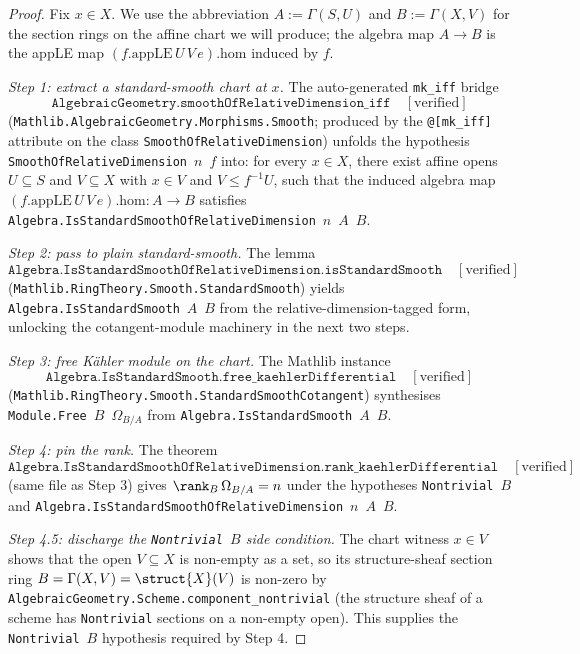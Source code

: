 \begin{proof}
  
  \leanok
  Fix \(x \in X\). We use the abbreviation \(A := \Gamma(S, U)\) and \(B := \Gamma(X, V)\) for the section rings on the affine chart we will produce; the algebra map \(A \to B\) is the appLE map \((f.\mathrm{appLE}\,U\,V\,e).\mathrm{hom}\) induced by \(f\).

  \emph{Step 1: extract a standard-smooth chart at \(x\).} The auto-generated \texttt{mk\_iff} bridge
  \[
    \texttt{AlgebraicGeometry.smoothOfRelativeDimension\_iff} \quad [\text{verified}]
  \]
  (\texttt{Mathlib.AlgebraicGeometry.Morphisms.Smooth}; produced by the \texttt{@[mk\_iff]} attribute on the class \texttt{SmoothOfRelativeDimension}) unfolds the hypothesis \texttt{SmoothOfRelativeDimension}~\(n\)~\(f\) into: for every \(x \in X\), there exist affine opens \(U \subseteq S\) and \(V \subseteq X\) with \(x \in V\) and \(V \leq f^{-1}U\), such that the induced algebra map \((f.\mathrm{appLE}\,U\,V\,e).\mathrm{hom}\colon A \to B\) satisfies \texttt{Algebra.IsStandardSmoothOfRelativeDimension}~\(n\)~\(A\)~\(B\).

  \emph{Step 2: pass to plain standard-smooth.} The lemma
  \[
    \texttt{Algebra.IsStandardSmoothOfRelativeDimension.isStandardSmooth} \quad [\text{verified}]
  \]
  (\texttt{Mathlib.RingTheory.Smooth.StandardSmooth}) yields \texttt{Algebra.IsStandardSmooth}~\(A\)~\(B\) from the relative-dimension-tagged form, unlocking the cotangent-module machinery in the next two steps.

  \emph{Step 3: free K\"ahler module on the chart.} The Mathlib instance
  \[
    \texttt{Algebra.IsStandardSmooth.free\_kaehlerDifferential} \quad [\text{verified}]
  \]
  (\texttt{Mathlib.RingTheory.Smooth.StandardSmoothCotangent}) synthesises \texttt{Module.Free}~\(B\)~\(\Omega_{B/A}\) from \texttt{Algebra.IsStandardSmooth}~\(A\)~\(B\).

  \emph{Step 4: pin the rank.} The theorem
  \[
    \texttt{Algebra.IsStandardSmoothOfRelativeDimension.rank\_kaehlerDifferential} \quad [\text{verified}]
  \]
  (same file as Step 3) gives \(\rank_B\,\Omega_{B/A} = n\) under the hypotheses \texttt{Nontrivial}~\(B\) and \texttt{Algebra.IsStandardSmoothOfRelativeDimension}~\(n\)~\(A\)~\(B\).

  \emph{Step 4.5: discharge the \texttt{Nontrivial}~\(B\) side condition.} The chart witness \(x \in V\) shows that the open \(V \subseteq X\) is non-empty as a set, so its structure-sheaf section ring \(B = \Gamma(X, V) = \struct{X}(V)\) is non-zero by \texttt{AlgebraicGeometry.Scheme.component\_nontrivial} (the structure sheaf of a scheme has \texttt{Nontrivial} sections on a non-empty open). This supplies the \texttt{Nontrivial}~\(B\) hypothesis required by Step 4.


\end{proof}
